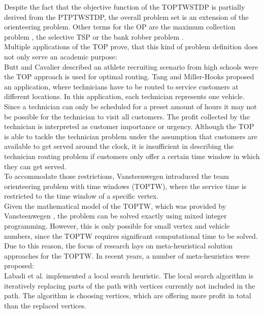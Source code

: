 \documentclass[final,5p,times,twocolumn]{elsarticle}
\begin{document}
Despite the fact that the objective function of the TOPTWSTDP is partially derived from the PTPTWSTDP, the overall problem set is an extension of the orienteering problem. Other terms for the OP are the maximum collection problem \cite{Butt:1994mcp}, the selective TSP  \cite{Laporte:1990stsp} or the bank robber problem \cite{Arkin:1998gno}.\\	
Multiple applications of the TOP prove, that this kind of problem definition does not only serve an academic purpose: \\
Butt and Cavalier \cite{Butt:1994mcp} described an athlete recruiting scenario from high schools were the TOP approach is used for optimal routing. Tang and Miller-Hooks \cite{Tang:2005tsh} proposed an application, where technicians have to be routed to service customers at different locations. In this application, each technician represents one vehicle. Since a technician can only be scheduled for a preset amount of hours it may not be possible for the technician to visit all customers. The profit collected by the technician is interpreted as customer importance or urgency. Although the TOP is able to tackle the technician problem under the assumption that customers are available to get served around the clock, it is insufficient in describing the technician routing problem if customers only offer a certain time window in which they can get served. \\
To accommodate those restrictions, Vansteenwegen \cite{Vansteenwegen:2008pet} introduced the team orienteering problem with time windows (TOPTW), where the service time is restricted to the time window of a specific vertex. \\
Given the mathematical model of the TOPTW, which was provided by Vansteenwegen \cite{Vansteenwegen:2011op}, the problem can be solved exactly using mixed integer programming. However, this is only possible for small vertex and vehicle numbers, since the TOPTW requires significant computational time to be solved. \\
Due to this reason, the focus of research lays on meta-heuristical solution approaches for the TOPTW. In recent years, a number of meta-heuristics were proposed: \\
Labadi et al. \cite{Labadi:2012toptw} implemented a local search heuristic. The local search algorithm is iteratively replacing parts of the path with vertices currently not included in the path. The algorithm is choosing vertices, which are offering more profit in total than the replaced vertices. \\
\end{document}
